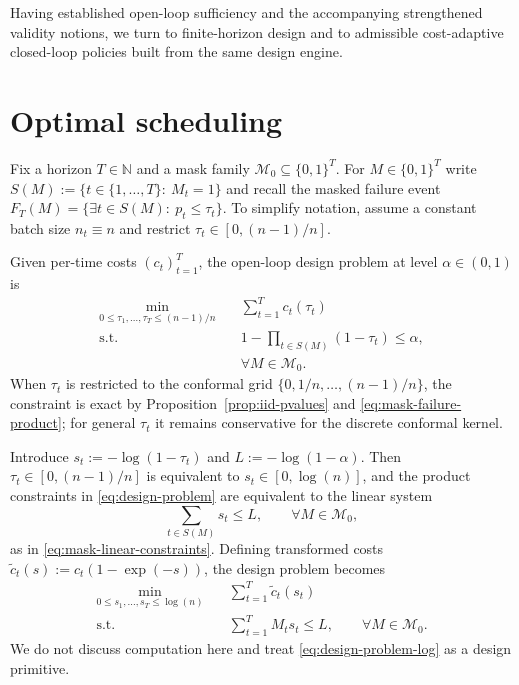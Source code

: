\documentclass{uai2026} %
\newcommand{\N}{\mathbb{N}}
\newcommand{\1}{\mathbf{1}}
\newcommand{\mcal}{\mathcal{M}}
\begin{document}
Having established open-loop sufficiency and the accompanying strengthened validity notions, we turn to finite-horizon design and to admissible cost-adaptive closed-loop policies built from the same design engine.

\fi

\section{Optimal scheduling}
\label{sec:finite}

Fix a horizon $T\in\N$ and a mask family $\mcal_{0}\subseteq\{0,1\}^{T}$.
For $M\in\{0,1\}^{T}$ write $S(M):=\{t\in\{1,\dots,T\}:\ M_{t}=1\}$ and recall the masked failure event $F_T(M)=\{\exists t\in S(M):\ p_t\le \tau_t\}$.
To simplify notation, assume a constant batch size $n_t\equiv n$ and restrict $\tau_t\in[0,(n-1)/n]$.

Given per-time costs $(c_t)_{t=1}^{T}$, the open-loop design problem at level $\alpha\in(0,1)$ is
\begin{equation}
  \label{eq:design-problem}
  \begin{aligned}
    \min_{0 \le \tau_{1},\dots,\tau_{T}\le (n-1)/n}\quad & \sum_{t=1}^{T} c_t(\tau_t)\\
    \text{s.t.}\quad & 1-\prod_{t\in S(M)}(1-\tau_t)\le \alpha,\\
    & \forall M\in\mcal_{0}.
  \end{aligned}
\end{equation}
When $\tau_t$ is restricted to the conformal grid $\{0,1/n,\dots,(n-1)/n\}$, the constraint is exact by Proposition~\ref{prop:iid-pvalues} and \eqref{eq:mask-failure-product}; for general $\tau_t$ it remains conservative for the discrete conformal kernel.

Introduce $s_t:=-\log(1-\tau_t)$ and $L:=-\log(1-\alpha)$.
Then $\tau_t\in[0,(n-1)/n]$ is equivalent to $s_t\in[0,\log(n)]$, and the product constraints in \eqref{eq:design-problem} are equivalent to the linear system
\begin{equation*}
  \sum_{t\in S(M)} s_t \le L,\qquad \forall M\in\mcal_{0},
\end{equation*}
as in \eqref{eq:mask-linear-constraints}.
Defining transformed costs $\tilde{c}_t(s):=c_t(1-\exp(-s))$, the design problem becomes
\begin{equation}
  \label{eq:design-problem-log}
  \begin{aligned}
    \min_{0 \le s_{1},\dots,s_{T}\le \log(n)}\quad & \sum_{t=1}^{T} \tilde{c}_t(s_t)\\
    \text{s.t.}\quad & \sum_{t=1}^{T} M_t s_t \le L,\qquad \forall M\in\mcal_{0}.
  \end{aligned}
\end{equation}
We do not discuss computation here and treat \eqref{eq:design-problem-log} as a design primitive.
\end{document}
